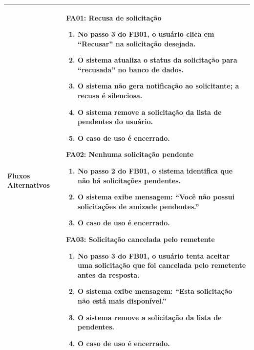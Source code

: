 \begin{longtable}{ >{\raggedright}p{2.8cm} | >{\raggedright\arraybackslash}p{10.7cm} }
Fluxos Alternativos & \mbox{}
\textbf{FA01:} Recusa de solicitação
\vspace{2pt}
\begin{enumerate}[nosep,leftmargin=1.2em,topsep=0pt,partopsep=0pt,parsep=0pt,itemsep=0pt,after=\vspace{2pt}]
    \item No passo 3 do FB01, o usuário clica em ``Recusar'' na solicitação desejada.
    \item O sistema atualiza o status da solicitação para ``recusada'' no banco de dados.
    \item O sistema não gera notificação ao solicitante; a recusa é silenciosa.
    \item O sistema remove a solicitação da lista de pendentes do usuário.
    \item O caso de uso é encerrado.
\end{enumerate}

\textbf{FA02:} Nenhuma solicitação pendente
\vspace{2pt}
\begin{enumerate}[nosep,leftmargin=1.2em,topsep=0pt,partopsep=0pt,parsep=0pt,itemsep=0pt,after=\vspace{2pt}]
    \item No passo 2 do FB01, o sistema identifica que não há solicitações pendentes.
    \item O sistema exibe mensagem: ``Você não possui solicitações de amizade pendentes.''
    \item O caso de uso é encerrado.
\end{enumerate}

\textbf{FA03:} Solicitação cancelada pelo remetente
\vspace{2pt}
\begin{enumerate}[nosep,leftmargin=1.2em,topsep=0pt,partopsep=0pt,parsep=0pt,itemsep=0pt,after=\vspace{2pt}]
    \item No passo 3 do FB01, o usuário tenta aceitar uma solicitação que foi cancelada pelo remetente antes da resposta.
    \item O sistema exibe mensagem: ``Esta solicitação não está mais disponível.''
    \item O sistema remove a solicitação da lista de pendentes.
    \item O caso de uso é encerrado.
\end{enumerate}
\mbox{} \\ \hline


\end{longtable}

